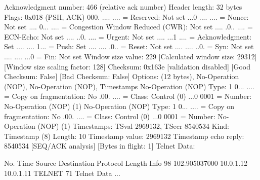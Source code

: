     Acknowledgment number: 466    (relative ack number)
    Header length: 32 bytes
    Flags: 0x018 (PSH, ACK)
        000. .... .... = Reserved: Not set
        ...0 .... .... = Nonce: Not set
        .... 0... .... = Congestion Window Reduced (CWR): Not set
        .... .0.. .... = ECN-Echo: Not set
        .... ..0. .... = Urgent: Not set
        .... ...1 .... = Acknowledgment: Set
        .... .... 1... = Push: Set
        .... .... .0.. = Reset: Not set
        .... .... ..0. = Syn: Not set
        .... .... ...0 = Fin: Not set
    Window size value: 229
    [Calculated window size: 29312]
    [Window size scaling factor: 128]
    Checksum: 0x163e [validation disabled]
        [Good Checksum: False]
        [Bad Checksum: False]
    Options: (12 bytes), No-Operation (NOP), No-Operation (NOP), Timestamps
        No-Operation (NOP)
            Type: 1
                0... .... = Copy on fragmentation: No
                .00. .... = Class: Control (0)
                ...0 0001 = Number: No-Operation (NOP) (1)
        No-Operation (NOP)
            Type: 1
                0... .... = Copy on fragmentation: No
                .00. .... = Class: Control (0)
                ...0 0001 = Number: No-Operation (NOP) (1)
        Timestamps: TSval 2969132, TSecr 8540534
            Kind: Timestamp (8)
            Length: 10
            Timestamp value: 2969132
            Timestamp echo reply: 8540534
    [SEQ/ACK analysis]
        [Bytes in flight: 1]
Telnet
    Data: 

No.     Time           Source                Destination           Protocol Length Info
     98 102.905037000  10.0.1.12             10.0.1.11             TELNET   71     Telnet Data ...

